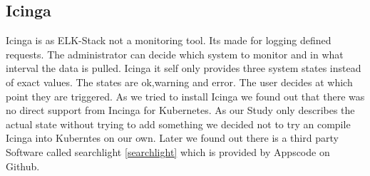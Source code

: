 \subsection{Icinga}
\label{Icinga}
Icinga is as ELK-Stack not a monitoring tool. Its made for logging defined requests. The administrator can decide which system to monitor and in what interval the data is pulled.
Icinga it self only provides three system states instead of exact values. The states are ok,warning and error. The user decides at which point they are triggered.
As we tried to install Icinga we found out that there was no direct support from Incinga for Kubernetes. As our Study only describes the actual state without trying to add something we decided not to try an compile Icinga into Kuberntes on our own. Later we found out there is a third party Software called searchlight \ref{searchlight} which is provided by Appscode on Github.
 